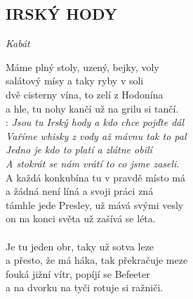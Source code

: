 \begin{flushleft}
	\section*{\Huge IRSKÝ HODY}
	\emph{Kabát}
\end{flushleft}

Máme plný stoly, uzený, bejky, voly\\
salátový mísy a taky ryby v soli\\
dvě cisterny vína, to zelí z Hodonína\\
a hle, tu nohy kančí už na grilu si tančí.\\

\textregistered:
\emph{Jsou tu Irský hody a kdo chce pojďte dál\\
Vaříme whisky  z vody až mávnu tak to pal\\
Jedno je kdo to  platí a zlátne obilí\\
A stokrát se nám vrátí to co jsme zaseli.}\\

A každá konkubína tu v pravdě místo má\\
a žádná není líná a svoji práci zná\\
támhle jede Presley, už mává svými vesly\\
on na konci světa už zašívá se léta.\\
\textregistered\\

Je tu jeden obr, taky už sotva leze\\
a přesto, že má háka, tak překračuje meze\\
fouká jižní vítr, popíjí se Befeeter\\
a na dvorku na tyči rotuje si ražniči.\\
\textregistered

\newpage
